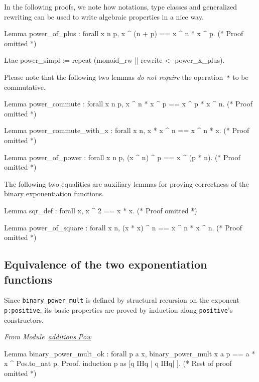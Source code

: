 In the following proofs, we note how notations, type classes and generalized 
rewriting can be used  to write algebraic properties in a nice way.

\begin{Coqsrc}
Lemma power_of_plus :   forall x n p, x ^ (n + p) ==  x ^ n *  x ^ p.
(* Proof omitted *)

Ltac power_simpl := 
    repeat (monoid_rw || rewrite <- power_x_plus).
\end{Coqsrc}

  Please note that the following two lemmas \emph{do not require} 
the operation~\texttt{*} to be commutative.

\begin{Coqsrc}
Lemma power_commute : 
    forall x n p, x ^ n * x ^ p ==  x ^ p * x ^ n. 
(* Proof omitted *) 

Lemma power_commute_with_x : 
    forall x n,  x * x ^ n == x ^ n * x.
(* Proof omitted *) 

Lemma power_of_power : 
   forall x n p,  (x ^ n) ^ p == x ^ (p * n).
(* Proof omitted *) 

\end{Coqsrc}

The following two equalities are auxiliary lemmas for proving correctness of the binary exponentiation functions.

\begin{Coqsrc}
Lemma sqr_def : forall x, x ^ 2 ==  x * x.
(* Proof omitted *) 

Lemma power_of_square : 
  forall x n, (x * x) ^ n ==  x ^ n * x ^ n.
(* Proof omitted *) 
\end{Coqsrc}

\subsection{Equivalence of the two exponentiation functions}

Since \texttt{binary\_power\_mult} is defined by structural recursion on the
exponent \texttt{p:positive}, its basic properties are proved by induction
along \texttt{positive}'s constructors.

\vspace{4pt}
\emph{From Module~\href{../theories/html/additions.Pow.html}{additions.Pow}}

\begin{Coqsrc}
Lemma binary_power_mult_ok :
  forall p a x,   binary_power_mult  x a p  ==  
                  a * x ^ Pos.to_nat p.
Proof.
  induction p as [q IHq | q IHq| ].
 (* Rest of proof omitted *)
 \end{Coqsrc}

